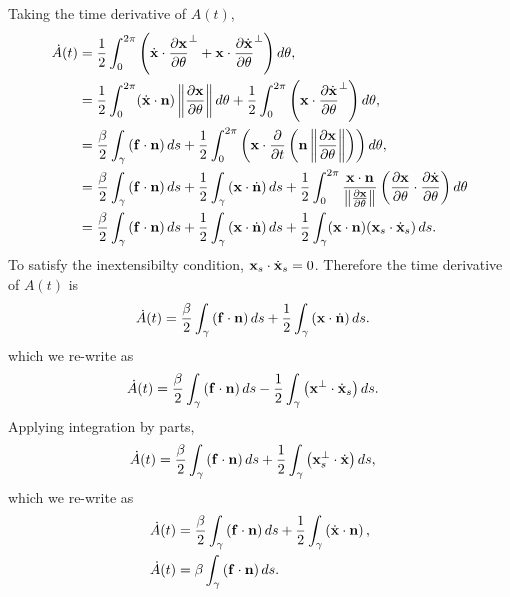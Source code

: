 \documentclass[aps,prl,showpacs]{revtex4}
\begin{document}
Taking the time derivative of $A(t)$,
\begin{align}
  \dot{A}(t) &= \frac{1}{2}\int_{0}^{2\pi} \left(\dot{\mathbf{x}} \cdot
  \frac{\partial \mathbf{x}}{\partial \theta}^{\perp} + 
    \mathbf{x} \cdot \frac{\partial \dot{\mathbf{x}}}{\partial \theta}^{\perp}\right) d\theta, \\
  &= \frac{1}{2}
  \int_{0}^{2\pi}(\dot{\mathbf{x}}\cdot\mathbf{n})\left\|\frac{\partial \mathbf{x}}{\partial \theta}\right\|d\theta +
     \frac{1}{2}\int_{0}^{2\pi}
    \left(\mathbf{x} \cdot \frac{\partial \dot{\mathbf{x}}}{\partial \theta}^{\perp}\right)d\theta, \\
  &= \frac{\beta}{2} \int_{\gamma}\left(\mathbf{f}\cdot\mathbf{n}\right)ds +
  \frac{1}{2}\int_{0}^{2\pi}\left(\mathbf{x} \cdot \frac{\partial }{\partial t}\left(\mathbf{n}
  \left\|\frac{\partial \mathbf{x}}{\partial \theta}\right\|\right)\right)d\theta, \\
  &= \frac{\beta}{2} \int_{\gamma}\left(\mathbf{f}\cdot\mathbf{n}\right)ds + \frac{1}{2}
  \int_{\gamma}\left(\mathbf{x}\cdot\dot{\mathbf{n}}\right)ds + \frac{1}{2}\int_{0}^{2\pi}
  \frac{\mathbf{x}\cdot\mathbf{n}}{\left\|\frac{\partial \mathbf{x}}{\partial \theta}\right\|}
  \left(\frac{\partial \mathbf{x}}{\partial \theta}\cdot
  \frac{\partial \dot{\mathbf{x}}}{\partial \theta}\right)d\theta \\
  &= \frac{\beta}{2} \int_{\gamma}\left(\mathbf{f}\cdot\mathbf{n}\right)ds + \frac{1}{2}
  \int_{\gamma}\left(\mathbf{x}\cdot\dot{\mathbf{n}}\right)ds + \frac{1}{2}\int_{\gamma}
  (\mathbf{x}\cdot\mathbf{n}) (\mathbf{x}_s \cdot \dot{\mathbf{x}}_s)\, ds.
\end{align}
To satisfy the inextensibilty condition, $\mathbf{x}_s \cdot \dot{\mathbf{x}}_s = 0$.
Therefore the time derivative of $A(t)$ is
\begin{align}
     \dot{A}(t) &= \frac{\beta}{2} \int_{\gamma}\left(\mathbf{f}\cdot\mathbf{n}\right)ds
     + \frac{1}{2} \int_{\gamma}\left(\mathbf{x}\cdot\dot{\mathbf{n}}\right)ds.
\end{align}
which we re-write as
\begin{align}
    \dot{A}(t) &= \frac{\beta}{2}
    \int_{\gamma}\left(\mathbf{f}\cdot\mathbf{n}\right)ds-\frac{1}{2}\int_{\gamma}\left(\mathbf{x}^{\perp}\cdot\dot{\mathbf{x}}_s\right) ds.
\end{align}
Applying integration by parts,
\begin{align}
    \dot{A}(t) &= \frac{\beta}{2}
    \int_{\gamma}\left(\mathbf{f}\cdot\mathbf{n}\right)ds+\frac{1}{2}\int_{\gamma}\left(\mathbf{x}^{\perp}_s\cdot\dot{\mathbf{x}}\right) ds,
\end{align}
which we re-write as
\begin{align}
    \dot{A}(t) &= \frac{\beta}{2}
    \int_{\gamma}\left(\mathbf{f}\cdot\mathbf{n}\right)ds+\frac{1}{2}\int_{\gamma}\left(\dot{\mathbf{x}}\cdot\mathbf{n}\right),\\
    \dot{A}(t) &= \beta \int_{\gamma}\left(\mathbf{f}\cdot\mathbf{n}\right)ds.
\end{align}
\end{document}
